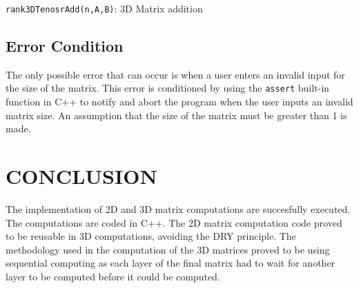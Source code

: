 \documentclass[conference]{IEEEtran}
\begin{document}
\linesnumbered

\begin{algorithm}[H]

\centring



\caption{\texttt{rank3DTenosrAdd(n,A,B)}: 3D Matrix addition}


\Return \C

\label{add3D}

\end{algorithm}

\subsection{Error Condition}
The only possible error that can occur is when a user enters an invalid input for the size of the matrix. This error is conditioned by using the \texttt{assert} built-in function in C++ to notify and abort the program when the user inputs an invalid matrix size. An assumption that the size of the matrix must be greater than 1 is made.


\section{CONCLUSION}
The implementation of 2D and 3D matrix computations are succesfully executed. The computations are coded in C++. The 2D matrix computation code proved to be reusable in 3D computations, avoiding the DRY principle. The methodology used in the computation of the 3D matrices proved to be using sequential computing as each layer of the final matrix had to wait for another layer to be computed before it could be computed.


\vspace{12pt}
\end{document}
